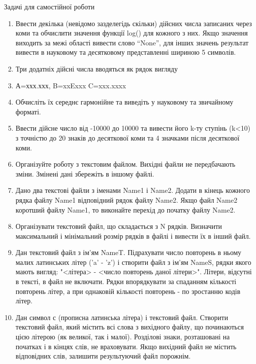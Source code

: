 \documentclass[]{article}
\makeatletter
\newcommand{\xslalph}[1]{\expandafter\@xslalph\csname c@#1\endcsname}
\newcommand{\@xslalph}[1]{%
    \ifcase#1\or а\or б\or в\or г\or д\or e\or є\or ж\or з\or i%
    \or й\or к\or л\or м\or н\or о\or п\or р\or с\or т%
    \or у\or ф\or х\or ц\or ч\or ш\or ю\or я\or аа\or бб\or вв%
    \else\@ctrerr\fi%
}
\makeatother
\begin{document}
\begin{enumerate}
\begin{enumerate}[label=\xslalph*)]
\begin{enumerate}
\begin{enumerate}[label=\xslalph*)]
Задачі для самостійної роботи

\begin{enumerate}
\def\labelenumi{\arabic{enumi})}
\item
  Ввести декілька (невідомо зазделегідь скільки) дійсних числа записаних
  через коми та обчислити значення функції log() для кожного з них. Якщо
  значення виходить за межі області вивести слово ``None'', для інших
  значень результат вивести в науковому та десятковому представленні
  шириною 5 символів.
\item
  Три додатніх дійсні числа вводяться як рядок вигляду
\item
  А=ххх.ххх, B=xxExxx C=xxx.xxxx
\item
  Обчисліть їх середнє гармонійне та виведіть у науковому та звичайному
  форматі.
\item
  Ввести дійсне число від -10000 до 10000 та вивести його k-ту ступінь
  (k\textless{}10) з точністю до 20 знаків до десяткової коми та 4
  значками після десяткової коми.
\item
  Організуйте роботу з текстовим файлом. Вихідні файли не передбачають
  зміни. Змінені дані збережіть в іншому файлі.
\item
  Дано два текстові файли з іменами Name1 і Name2. Додати в кінець
  кожного рядка файлу Name1 відповідний рядок файлу Name2. Якщо файл
  Name2 коротший файлу Name1, то виконайте перехід до початку файлу
  Name2.
\item
  Організувати текстовий файл, що складається з N рядків. Визначити
  максимальний і мінімальний розмір рядків в файлі і вивести їх в інший
  файл.
\item
  Дан текстовий файл з ім'ям NameT. Підрахувати число повторень в ньому
  малих латинських літер ('a' - 'z') і створити файл з ім'ям NameS,
  рядки якого мають вигляд: "\textless{}літера\textgreater{} -
  \textless{}число повторень даної літери\textgreater{}". Літери,
  відсутні в тексті, в файл не включати. Рядки впорядкувати за спаданням
  кількості повторень літер, а при однаковій кількості повторень - по
  зростанню кодів літер.
\item
  Дан символ с (прописна латинська літера) і текстовий файл. Створити
  текстовий файл, який містить всі слова з вихідного файлу, що
  починаються цією літерою (як великої, так і малої). Розділові знаки,
  розташовані на початках і в кінцях слів, не враховувати. Якщо вихідний
  файл не містить відповідних слів, залишити результуючий файл порожнім.
\end{enumerate}


\end{enumerate}
\end{enumerate}
\end{enumerate}
\end{enumerate}
\end{document}
